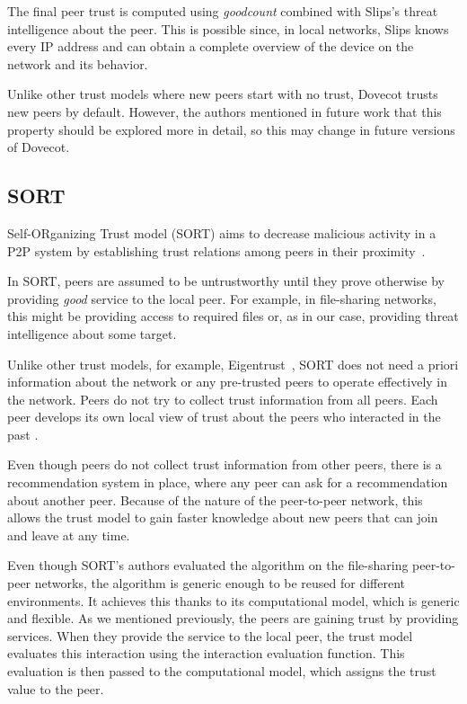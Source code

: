 The final peer trust is computed using \textit{goodcount} combined with Slips's threat intelligence about the peer. 
This is possible since, in local networks, Slips knows every IP address and can obtain a complete overview of the device on the network and its behavior.

Unlike other trust models where new peers start with no trust, Dovecot trusts new peers by default. 
However, the authors mentioned in future work that this property should be explored more in detail, so this may change in future versions of Dovecot.

\subsection{SORT}
\label{subsec:sort}
Self-ORganizing Trust model (SORT) aims to decrease malicious activity in a P2P system by establishing trust relations among peers in their proximity~\cite{sort}.

In SORT, peers are assumed to be untrustworthy until they prove otherwise by providing \textit{good} service to the local peer. 
For example, in file-sharing networks, this might be providing access to required files or, as in our case, providing threat intelligence about some target.

Unlike other trust models, for example, Eigentrust~\cite{kamvar2003eigentrust}, SORT does not need a priori information about the network or any pre-trusted peers to operate effectively in the network.
Peers do not try to collect trust information from all peers.
Each peer develops its own local view of trust about the peers who interacted in the past \cite{sort}.

Even though peers do not collect trust information from other peers, there is a recommendation system in place, where any peer can ask for a recommendation about another peer.
Because of the nature of the peer-to-peer network, this allows the trust model to gain faster knowledge about new peers that can join and leave at any time.

Even though SORT's authors evaluated the algorithm on the file-sharing peer-to-peer networks, the algorithm is generic enough to be reused for different environments.
It achieves this thanks to its computational model, which is generic and flexible.
As we mentioned previously, the peers are gaining trust by providing services. 
When they provide the service to the local peer, the trust model evaluates this interaction using the interaction evaluation function.
This evaluation is then passed to the computational model, which assigns the trust value to the peer.

